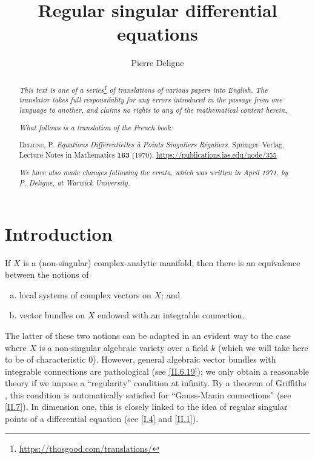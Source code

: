 \documentclass{report}
\title{Regular singular differential equations}
\author{Pierre Deligne}
\date{}
\theoremstyle{plain}
\theoremstyle{definition}
\newcommand{\oldpage}[1]{\marginpar{\footnotesize$\Big\vert$ \textit{p.~#1}}}
\begin{document}
\maketitle

\renewcommand{\abstractname}{Translator's note.}

\begin{abstract}
  \renewcommand*{\thefootnote}{\fnsymbol{footnote}}
  \emph{This text is one of a series\footnote{\url{https://thosgood.com/translations/}} of translations of various papers into English.}
  \emph{The translator takes full responsibility for any errors introduced in the passage from one language to another, and claims no rights to any of the mathematical content herein.}
  
  \emph{What follows is a translation of the French book:}

  \medskip\noindent
  \textsc{Deligne, P.}
  \emph{Equations Diff\'{e}rentielles \`{a} Points Singuliers R\'{e}guliers.}
  Springer--Verlag, Lecture Notes in Mathematics \textbf{163} (1970).
  {\footnotesize\url{https://publications.ias.edu/node/355}}

  \medskip
  \noindent\emph{We have also made changes following the errata, which was written in April 1971, by P. Deligne, at Warwick University.}
\end{abstract}

\setcounter{footnote}{0}

\tableofcontents




\setcounter{chapter}{-1}

\chapter{Introduction}
\label{0}

\oldpage{1}
If $X$ is a (non-singular) complex-analytic manifold, then there is an equivalence between the notions of
\begin{enumerate}[a)]
  \item local systems of complex vectors on $X$; and
  \item vector bundles on $X$ endowed with an integrable connection.
\end{enumerate}

The latter of these two notions can be adapted in an evident way to the case where $X$ is a non-singular algebraic variety over a field $k$ (which we will take here to be of characteristic $0$).
However, general algebraic vector bundles with integrable connections are pathological (see \cref{II.6.19});
we only obtain a reasonable theory if we impose a ``regularity'' condition at infinity.
By a theorem of Griffiths \cite{8}, this condition is automatically satisfied for ``Gauss-Manin connections'' (see \cref{II.7}).
In dimension one, this is closely linked to the idea of regular singular points of a differential equation (see \cref{I.4} and \cref{II.1}).
\end{document}
